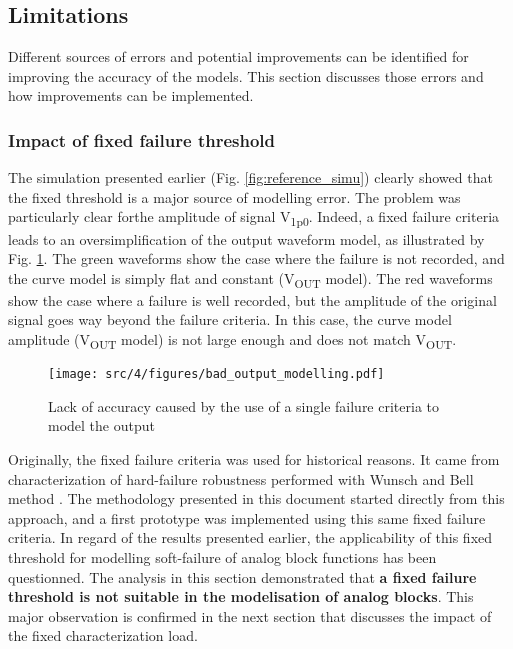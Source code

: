 \subsection{Limitations}
\label{sec:current-limitations}

Different sources of errors and potential improvements can be identified for improving the accuracy of the models.
This section discusses those errors and how improvements can be implemented.

\subsubsection{Impact of fixed failure threshold}
\label{sec:fixed-failure-threshold}

The simulation presented earlier (Fig. \ref{fig:reference_simu}) clearly showed that the fixed threshold is a major source of modelling error.
The problem was particularly clear forthe amplitude of signal V\textsubscript{1p0}.
Indeed, a fixed failure criteria leads to an oversimplification of the output waveform model, as illustrated by Fig. \ref{fig:impact-single-failure-criteria}.
The green waveforms show the case where the failure is not recorded, and the curve model is simply flat and constant (V\textsubscript{OUT} model).
The red waveforms show the case where a failure is well recorded, but the amplitude of the original signal goes way beyond the failure criteria.
In this case, the curve model amplitude (V\textsubscript{OUT} model) is not large enough and does not match V\textsubscript{OUT}.

\begin{figure}[!h]
  \centering
  \texttt{[image: src/4/figures/bad\_output\_modelling.pdf]}
  \caption{Lack of accuracy caused by the use of a single failure criteria to model the output}
  \label{fig:impact-single-failure-criteria}
\end{figure}

%
Originally, the fixed failure criteria was used for historical reasons.
It came from characterization of hard-failure robustness performed with Wunsch and Bell method \cite{wunsch-bell}.
The methodology presented in this document started directly from this approach, and a first prototype was implemented using this same fixed failure criteria.
In regard of the results presented earlier, the applicability of this fixed threshold for modelling soft-failure of analog block functions has been questionned.
The analysis in this section demonstrated that \textbf{a fixed failure threshold is not suitable in the modelisation of analog blocks}.
This major observation is confirmed in the next section that discusses the impact of the fixed characterization load.

